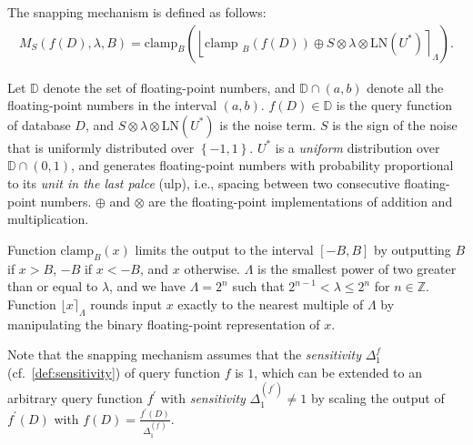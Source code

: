 
The snapping mechanism is defined as follows:
\begin{equation}
    \begin{split}
        M_{S}\left(f\left(D\right),\lambda,B\right) =\text{clamp}_{B}\left(\left\lfloor\text {clamp }_{B}\left(f\left(D\right) \right) \oplus S\otimes \lambda\otimes \text{LN}\left(U^{*}\right) \right\rceil_{\Lambda}\right).
    \end{split}
\end{equation}


Let $\mathbb{D}$ denote the set of floating-point numbers, and $\mathbb{D} \cap \left(a,b\right) $ denote all the floating-point numbers in the interval $\left(a,b\right)$.
$f\left(D\right) \in \mathbb{D} $ is the query function of database $D$, and $S\otimes \lambda\otimes \text{LN}\left(U^{*}\right)$ is the noise term.
$S$ is the sign of the noise that is uniformly distributed over $\left\{-1,1\right\} $. $U^{*}$ is a \textit{uniform} distribution over $\mathbb{D} \cap \left(0,1\right) $, and generates floating-point numbers with probability proportional to its \textit{unit in the last palce} (ulp), i.e., spacing between two consecutive floating-point numbers. 
$\oplus$ and $\otimes$ are the floating-point implementations of addition and multiplication.

Function $\text{clamp}_{B}\left(x\right) $ limits the output to the interval $\left[-B, B\right] $ by outputting $B$ if $x > B$, $-B$ if $x < -B$, and $x$ otherwise.   $\Lambda$ is the smallest power of two greater than or equal to $\lambda$, and we have $\Lambda=2^{n}$ such that $2^{n-1} < \lambda \leq2^{n}$ for $n \in \mathbb{Z} $. Function $\lfloor x\rceil_{\Lambda}$ rounds input $x$ exactly to the nearest multiple of $\Lambda$ by manipulating the binary floating-point representation of $x$.

Note that the snapping mechanism assumes that the \textit{sensitivity} $\Delta_1 ^{f} $ (cf.~\autoref{def:sensitivity}) of query function $f$ is $1$, which can be extended to an arbitrary query function $f^{\prime}$ with \textit{sensitivity} $\Delta _1^{\left(f^{\prime}\right) }\neq 1$ by scaling the output of $f^{\prime}\left(D\right) $ with $f\left(D\right) =\frac{f^{\prime}\left(D\right) }{\Delta_1 ^{\left(f^{\prime}\right) }}$.

